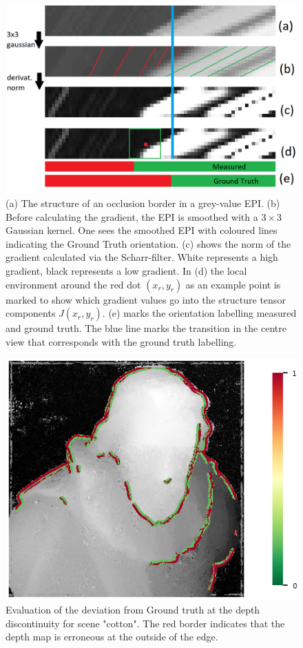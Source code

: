 \documentclass  [
  paper    = a4,
  BCOR     = 10mm,
  twoside,
  fontsize = 12pt,
  fleqn,
  toc      = bibnumbered,
  toc      = listofnumbered,
  numbers  = noendperiod,
  headings = normal,
  listof   = leveldown,
  version  = 3.03
]                                       {scrreprt}
\begin{document}
  \begin{figure}
  	\centering
  	\includegraphics[width=0.7\linewidth]{images/occlusion_painted2}
  	\caption[Occlusion in an EPI]{(a) The structure of an occlusion border in a grey-value EPI. (b) Before calculating the gradient, the EPI is smoothed with a $3 \times 3$ Gaussian kernel. One sees the smoothed EPI with coloured lines indicating the Ground Truth orientation. (c) shows the norm of the gradient calculated via the Scharr-filter. White represents a high gradient, black represents a low gradient. In (d) the local environment around the red dot $(x_r,y_r)$ as an example point is marked to show which gradient values go into the structure tensor components $J(x_r,y_r)$. (e) marks the orientation labelling measured and ground truth. The blue line marks the transition in the centre view that corresponds with the ground truth labelling. }
  	\label{fig:occlusion}
  \end{figure}
\begin{figure}
	\centering
	\includegraphics[width=0.7\linewidth]{images/cotton_discontinuities_0070}
	\caption[Discontinuity evaluation]{Evaluation of the deviation from Ground truth at the depth discontinuity for scene "cotton". The red border indicates that the depth map is erroneous at the outside of the edge.}
	\label{fig:cottondiscontinuities0070}
\end{figure}
  
\end{document}
